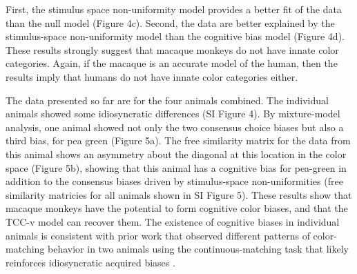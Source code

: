 First, the stimulus space non-uniformity model provides a better fit of the data than the null model (Figure 4c). 
Second, the data are better explained by the stimulus-space non-uniformity model than the cognitive bias model (Figure 4d). 
These results strongly suggest that macaque monkeys do not have innate color categories. 
Again, if the macaque is an accurate model of the human, then the results imply that humans do not have innate color categories either. 

The data presented so far are for the four animals combined. 
The individual animals showed some idiosyncratic differences (SI Figure 4).
By mixture-model analysis, one animal showed not only the two consensus choice biases but also a third bias, for pea green (Figure 5a). 
The free similarity matrix for the data from this animal shows an asymmetry about the diagonal at this location in the color space (Figure 5b), showing that this animal has a cognitive bias for pea-green in addition to the consensus biases driven by stimulus-space non-uniformities (free similarity matricies for all animals shown in SI Figure 5). 
These results show that macaque monkeys have the potential to form cognitive color biases, and that the TCC-v model can recover them. The existence of cognitive biases in individual animals is consistent with prior work that observed different patterns of color-matching behavior in two animals using the continuous-matching task that likely reinforces idiosyncratic acquired biases \citep{panichello_error-correcting_2019}.


